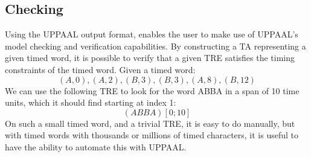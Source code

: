 \subsection{Checking}\label{subsec:checking}



Using the UPPAAL output format, enables the user to make use of UPPAAL's model checking and verification capabilities.
By constructing a TA representing a given timed word, it is possible to verify that a given TRE satisfies the timing constraints of the timed word.
Given a timed word: $$(A, 0), (A, 2), (B, 3), (B, 3), (A, 8), (B, 12)$$
We can use the following TRE to look for the word ABBA in a span of 10 time units, which it should find starting at index 1: $$(ABBA)[0;10]$$
On such a small timed word, and a trivial TRE, it is easy to do manually, but with timed words with thousands or millions of timed characters, it is useful to have the ability to automate this with UPPAAL.

